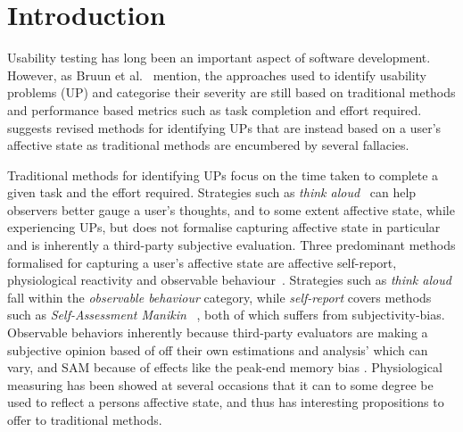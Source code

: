 	
\section{Introduction}

Usability testing has long been an important aspect of software development.
However, as Bruun et al.~\cite{LH-paper} mention, the approaches used to
identify usability problems (UP) and categorise their severity are still based
on traditional methods and performance based metrics such as task completion and effort required. \cite{LH-paper} suggests revised methods
for identifying UPs that are instead based on a user's affective state as
traditional methods are encumbered by several fallacies.


Traditional methods for identifying UPs focus on the time taken to complete a
given task and the effort required. Strategies such as \textit{think
aloud}~\cite{use_of_TA_and_IDA} can help observers better gauge a user's
thoughts, and to some extent affective state, while experiencing UPs, but does
not formalise capturing affective state in particular and is inherently a third-party
subjective evaluation. Three predominant methods formalised for capturing a
user's affective state are affective self-report, physiological reactivity and
observable behaviour~\cite{BRADLEY199449}. Strategies such as \textit{think
aloud} fall within the \textit{observable behaviour} category, while
\textit{self-report} covers methods such as \textit{Self-Assessment Manikin}
~\cite{BRADLEY199449}, both of which suffers from 
subjectivity-bias. Observable behaviors inherently because third-party evaluators are making a subjective opinion based of off their own estimations and analysis' which can vary\cite{eval_effect}, and SAM because of effects like the peak-end memory bias \cite{cockburn_peakend}.
Physiological measuring has been showed at several occasions that it can to some degree be used to reflect a persons affective state, and thus has interesting propositions to offer to traditional methods.

